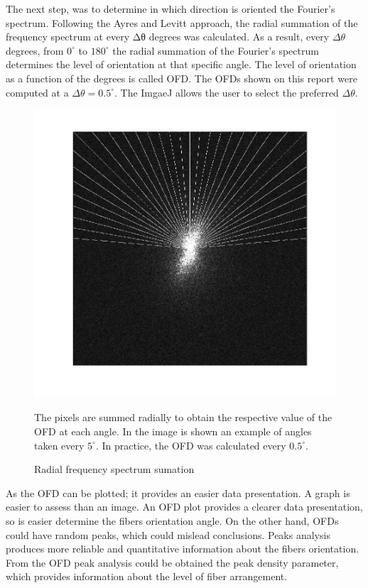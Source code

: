 \documentclass[12pt,a4paper]{article}
\begin{document}
The next step, was to determine in which direction is oriented the Fourier’s spectrum. Following the Ayres and Levitt approach, the radial summation of the frequency spectrum at every Δθ degrees was calculated. As a result, every $\Delta\theta$ degrees, from $0^{\circ}$ to $180^{\circ}$ the radial summation of the Fourier’s spectrum determines the level of orientation at that specific angle. The level of orientation as a function of the degrees is called OFD.  The OFDs shown on this report were computed at a $\Delta\theta = 0.5^{\circ}$. The ImgaeJ allows the user to select the preferred $\Delta\theta$.

\begin{figure}
  \includegraphics[width=\linewidth]{FiguresDisertation/figure3.jpg}
  \caption{Radial frequency spectrum sumation}
 \medskip
  \small
  The pixels are summed radially to obtain the respective value of the OFD at each angle. In the image is shown an example of angles taken every $5^{\circ}$. In practice, the OFD was calculated every $0.5^{\circ}$.
\end{figure}

As the OFD can be plotted; it provides an easier data presentation. A graph is easier to assess than an image.  An OFD plot provides a clearer data presentation, so is easier determine the fibers orientation angle. On the other hand, OFDs could have random peaks, which could mislead conclusions. Peaks analysis produces more reliable and quantitative information about the fibers orientation. From the  OFD peak analysis could be obtained the peak density parameter, which provides information about the level of fiber arrangement.
\end{document}
